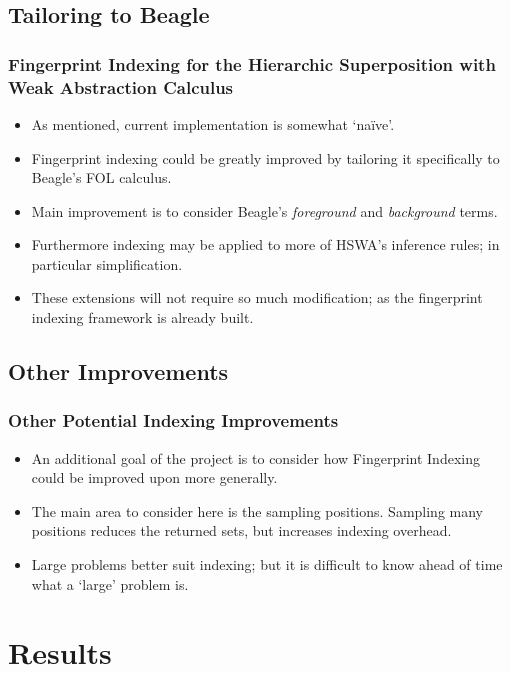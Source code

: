 \documentclass[10pt,xcolor={dvipsnames}]{beamer}
\begin{document}
\begin{NoHyper}
\subsection{Tailoring to Beagle}
\begin{frame}
  \frametitle{Fingerprint Indexing for the Hierarchic Superposition with Weak Abstraction Calculus}
  \begin{itemize}
  \item<1-> As mentioned, current implementation is somewhat `na\"{i}ve'.
  \item<2-> Fingerprint indexing could be greatly improved by tailoring it specifically
  to Beagle's FOL calculus.
  \item<2-> Main improvement is to consider Beagle's \emph{foreground} and \emph{background}
  terms.
  \item<3-> Furthermore indexing may be applied to more
  of HSWA's inference rules; in particular simplification.
  \item<4-> These extensions will not require so much modification; as the fingerprint
  indexing framework is already built.
  \end{itemize}
\end{frame}

\subsection{Other Improvements}
\begin{frame}
  \frametitle{Other Potential Indexing Improvements}
  \begin{itemize}
  \item<1-> An additional goal of the project is to consider how Fingerprint Indexing
  could be improved upon more generally.
  \item<2-> The main area to consider here is the sampling positions. Sampling many
  positions reduces the returned sets, but increases indexing overhead.
  \item<3-> Large problems better suit indexing; but it is difficult to know ahead of
  time what a `large' problem is.
  \end{itemize}
\end{frame}



\section{Results}


\end{NoHyper}
\end{document}
